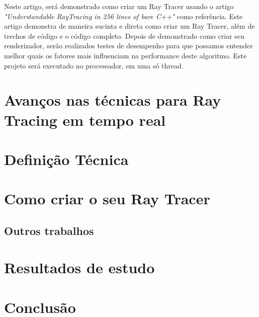 \documentclass[journal]{IEEEtran}
\begin{document}
Neste artigo, será demonstrado como criar um Ray Tracer usando o artigo 
\emph{"Understandable RayTracing in 256 lines of bare C++"}\cite{c14} como referência.
Este artigo demonstra de maneira sucinta e direta como criar um Ray Tracer,
além de trechos de código e o código completo. Depois de demonstrado como
criar seu renderizador, serão realizados testes de desempenho para que
possamos entender melhor quais os fatores mais influenciam na performance
deste algoritmo. Este projeto será executado no processador, em uma
só thread.

\section{Avanços nas técnicas para Ray Tracing em tempo real}

\section{Definição Técnica}

\section{Como criar o seu Ray Tracer}

\subsection{Outros trabalhos}

\section{Resultados de estudo}

\section{Conclusão}




\end{document}
